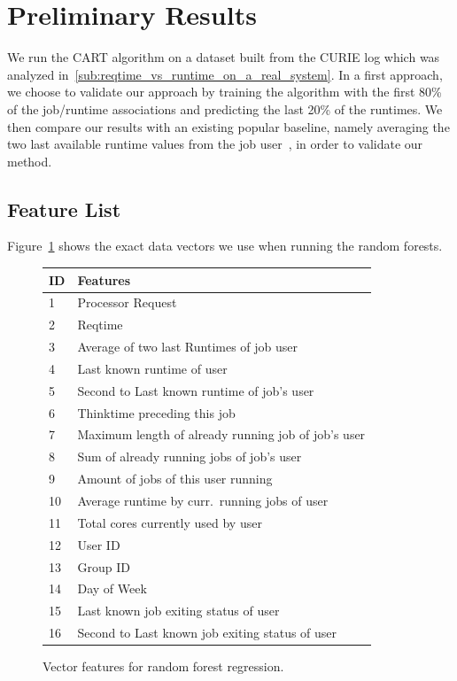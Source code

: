 \documentclass{article}
\begin{document}

\section{Preliminary Results}
\label{sec:preliminary_results}
We run the CART algorithm on a dataset built from the CURIE log which was analyzed in~\ref{sub:reqtime_vs_runtime_on_a_real_system}. In a first approach, we choose to validate our approach by training the algorithm with the first 80\% of the job/runtime associations and predicting the last 20\% of the runtimes. We then compare our results with an existing popular baseline, namely averaging the two last available runtime values from the job user~\cite{tsafir}, in order to validate our method.

\subsection{Feature List}
\label{sub:feature_list}
Figure~\ref{fig:features} shows the exact data vectors we use when running the random forests.

\begin{figure}[!ht]
  \centering
  \begin{tabular}{|l|l|}
    \hline
    ID & Features \\
    \hline
    1  &  Processor Request  \\
    2  &  Reqtime  \\
    3  &  Average of two last Runtimes of job user \\
    4  &  Last known runtime of user\\
    5  &  Second to Last known runtime of job's user \\
    6  &  Thinktime preceding this job \\
    7  &  Maximum length of already running job of job's user\\
    8  &  Sum of already running jobs of job's user\\
    9  &  Amount of jobs of this user running \\
    10 &  Average runtime by curr.\ running jobs of user\\
    11 &  Total cores currently used by user\\
    12 &  User ID \\
    13 &  Group ID\\
    14 &  Day of Week\\
    15 &  Last known job exiting status of user\\
    16 &  Second to  Last known job exiting status of user\\
    \hline
  \end{tabular}
  \caption{Vector features for random forest regression.}
  \label{fig:features}
\end{figure}
\end{document}
